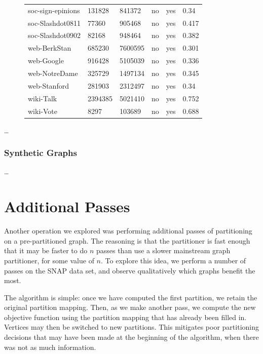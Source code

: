 \documentclass[11pt]{article}
\begin{document}
\begin{figure}
{\begin{tabular}{ *6l }
soc-sign-epinions & 131828 & 841372 & no & yes & 0.34\\ 
soc-Slashdot0811 & 77360 & 905468 & no & yes & 0.417\\ 
soc-Slashdot0902 & 82168 & 948464 & no & yes & 0.382\\ 
web-BerkStan & 685230 & 7600595 & no & yes & 0.301\\ 
web-Google & 916428 & 5105039 & no & yes & 0.336\\ 
web-NotreDame & 325729 & 1497134 & no & yes & 0.345\\ 
web-Stanford & 281903 & 2312497 & no & yes & 0.34\\ 
wiki-Talk & 2394385 & 5021410 & no & yes & 0.752\\ 
wiki-Vote  & 8297 & 103689 & no & yes & 0.688\\ 
 \hline
\end{tabular}\par
}
\end{figure}

\dots

\subsubsection{Synthetic Graphs}
\dots

\section{Additional Passes}
Another operation we explored was performing additional passes of partitioning on a pre-partitioned graph. The reasoning is that the partitioner is fast enough that it may be faster to do $n$ passes than use a slower mainstream graph partitioner, for some value of $n$. To explore this idea, we perform a number of passes on the SNAP data set, and observe qualitatively which graphs benefit the most. 

The algorithm is simple: once we have computed the first partition, we retain the original partition mapping. Then, as we make another pass, we compute the new objective function using the partition mapping that has already been filled in. Vertices may then be switched to new partitions. This mitigates poor partitioning decisions that may have been made at the beginning of the algorithm, when there was not as much information. 
\end{document}
